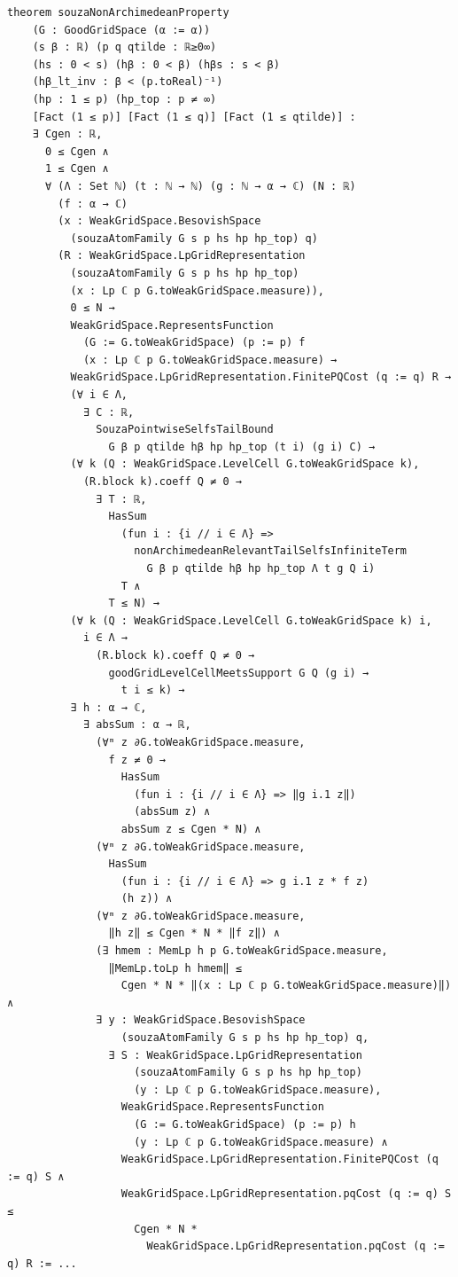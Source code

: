 \documentclass[11pt]{amsart}
\theoremstyle{definition}
\begin{document}
\begin{lstlisting}[style=lean,basicstyle=\ttfamily\scriptsize]
theorem souzaNonArchimedeanProperty
    (G : GoodGridSpace (α := α))
    (s β : ℝ) (p q qtilde : ℝ≥0∞)
    (hs : 0 < s) (hβ : 0 < β) (hβs : s < β)
    (hβ_lt_inv : β < (p.toReal)⁻¹)
    (hp : 1 ≤ p) (hp_top : p ≠ ∞)
    [Fact (1 ≤ p)] [Fact (1 ≤ q)] [Fact (1 ≤ qtilde)] :
    ∃ Cgen : ℝ,
      0 ≤ Cgen ∧
      1 ≤ Cgen ∧
      ∀ (Λ : Set ℕ) (t : ℕ → ℕ) (g : ℕ → α → ℂ) (N : ℝ)
        (f : α → ℂ)
        (x : WeakGridSpace.BesovishSpace
          (souzaAtomFamily G s p hs hp hp_top) q)
        (R : WeakGridSpace.LpGridRepresentation
          (souzaAtomFamily G s p hs hp hp_top)
          (x : Lp ℂ p G.toWeakGridSpace.measure)),
          0 ≤ N →
          WeakGridSpace.RepresentsFunction
            (G := G.toWeakGridSpace) (p := p) f
            (x : Lp ℂ p G.toWeakGridSpace.measure) →
          WeakGridSpace.LpGridRepresentation.FinitePQCost (q := q) R →
          (∀ i ∈ Λ,
            ∃ C : ℝ,
              SouzaPointwiseSelfsTailBound
                G β p qtilde hβ hp hp_top (t i) (g i) C) →
          (∀ k (Q : WeakGridSpace.LevelCell G.toWeakGridSpace k),
            (R.block k).coeff Q ≠ 0 →
              ∃ T : ℝ,
                HasSum
                  (fun i : {i // i ∈ Λ} =>
                    nonArchimedeanRelevantTailSelfsInfiniteTerm
                      G β p qtilde hβ hp hp_top Λ t g Q i)
                  T ∧
                T ≤ N) →
          (∀ k (Q : WeakGridSpace.LevelCell G.toWeakGridSpace k) i,
            i ∈ Λ →
              (R.block k).coeff Q ≠ 0 →
                goodGridLevelCellMeetsSupport G Q (g i) →
                  t i ≤ k) →
          ∃ h : α → ℂ,
            ∃ absSum : α → ℝ,
              (∀ᵐ z ∂G.toWeakGridSpace.measure,
                f z ≠ 0 →
                  HasSum
                    (fun i : {i // i ∈ Λ} => ‖g i.1 z‖)
                    (absSum z) ∧
                  absSum z ≤ Cgen * N) ∧
              (∀ᵐ z ∂G.toWeakGridSpace.measure,
                HasSum
                  (fun i : {i // i ∈ Λ} => g i.1 z * f z)
                  (h z)) ∧
              (∀ᵐ z ∂G.toWeakGridSpace.measure,
                ‖h z‖ ≤ Cgen * N * ‖f z‖) ∧
              (∃ hmem : MemLp h p G.toWeakGridSpace.measure,
                ‖MemLp.toLp h hmem‖ ≤
                  Cgen * N * ‖(x : Lp ℂ p G.toWeakGridSpace.measure)‖) ∧
              ∃ y : WeakGridSpace.BesovishSpace
                  (souzaAtomFamily G s p hs hp hp_top) q,
                ∃ S : WeakGridSpace.LpGridRepresentation
                    (souzaAtomFamily G s p hs hp hp_top)
                    (y : Lp ℂ p G.toWeakGridSpace.measure),
                  WeakGridSpace.RepresentsFunction
                    (G := G.toWeakGridSpace) (p := p) h
                    (y : Lp ℂ p G.toWeakGridSpace.measure) ∧
                  WeakGridSpace.LpGridRepresentation.FinitePQCost (q := q) S ∧
                  WeakGridSpace.LpGridRepresentation.pqCost (q := q) S ≤
                    Cgen * N *
                      WeakGridSpace.LpGridRepresentation.pqCost (q := q) R := ...
\end{lstlisting}
\end{document}
